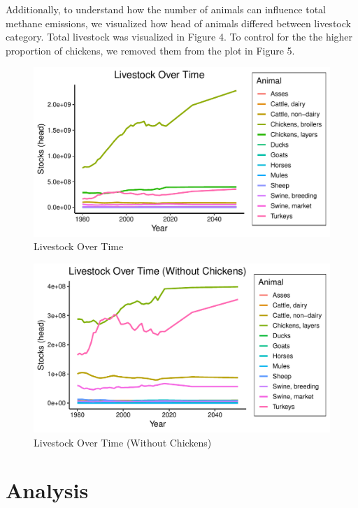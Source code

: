 \documentclass[
  12pt,
]{article}
\begin{document}
Additionally, to understand how the number of animals can influence
total methane emissions, we visualized how head of animals differed
between livestock category. Total livestock was visualized in Figure 4.
To control for the the higher proportion of chickens, we removed them
from the plot in Figure 5.

\begin{figure}
\centering
\includegraphics{SultzerSwit_ENV872_Project_files/figure-latex/animal.head-1.pdf}
\caption{Livestock Over Time}
\end{figure}

\begin{figure}
\centering
\includegraphics{SultzerSwit_ENV872_Project_files/figure-latex/no.chix-1.pdf}
\caption{Livestock Over Time (Without Chickens)}
\end{figure}

\newpage

\hypertarget{analysis}{%
\section{Analysis}\label{analysis}}
\end{document}
